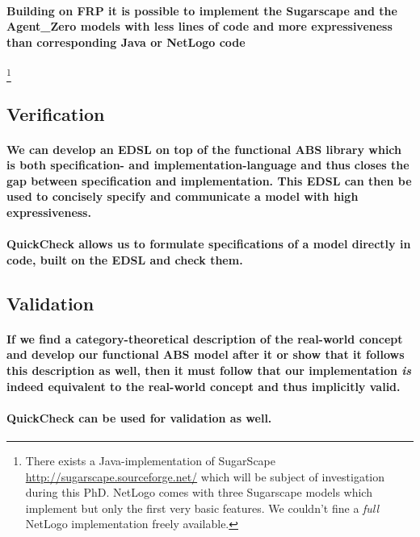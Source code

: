 \paragraph{Building on FRP it is possible to implement the Sugarscape and the Agent\_Zero models with less lines of code and more expressiveness than corresponding Java or NetLogo code} 
\footnote{There exists a Java-implementation of SugarScape \url{http://sugarscape.sourceforge.net/} which will be subject of investigation during this PhD. NetLogo comes with three Sugarscape models which implement but only the first very basic features. We couldn't fine a \textit{full} NetLogo implementation freely available.}

\subsection{Verification}
\paragraph{We can develop an EDSL on top of the functional ABS library which is both specification- and implementation-language and thus closes the gap between specification and implementation. This EDSL can then be used to concisely specify and communicate a model with high expressiveness.}
\paragraph{QuickCheck allows us to formulate specifications of a model directly in code, built on the EDSL and check them.}

\subsection{Validation}
\paragraph{If we find a category-theoretical description of the real-world concept and develop our functional ABS model after it or show that it follows this description as well, then it must follow that our implementation \textit{is} indeed equivalent to the real-world concept and thus implicitly valid.}
\paragraph{QuickCheck can be used for validation as well.}



